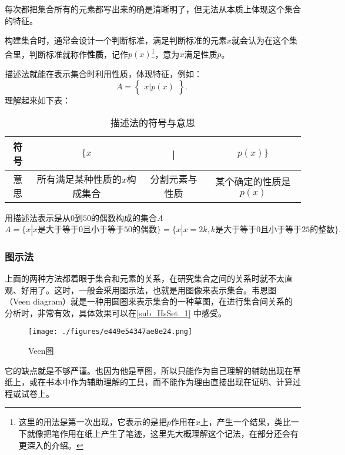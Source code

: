 每次都把集合所有的元素都写出来的确是清晰明了，但无法从本质上体现这个集合的特征。

构建集合时，通常会设计一个判断标准，满足判断标准的元素$x$就会认为在这个集合里，判断标准就称作\textbf{性质}，记作$p(x)$\footnote{这里的用法是第一次出现，它表示的是把$p$作用在$x$上，产生一个结果，类比一下就像把笔作用在纸上产生了笔迹，这里先大概理解这个记法，在部分还会有更深入的介绍。}，意为$x$满足性质$p$。

描述法就能在表示集合时利用性质，体现特征，例如：
\begin{equation}
A=\begin{Bmatrix} x|p(x) \end{Bmatrix}.~
\end{equation}
理解起来如下表：
\begin{table}[h]
\caption{描述法的符号与意思}\label{tab_HsSet1}
\centering
\begin{tabular}{|c|c|c|c|}
\hline
符号 & $\{x$ &|& $p(x)\}$ \\
\hline
意思 & 所有满足某种性质的$x$构成集合 &分割元素与性质& 某个确定的性质是$p(x)$ \\
\hline
\end{tabular}
\end{table}

\begin{example}{用描述法表示是从$0$到$50$的偶数构成的集合$A$}
$$A=\{x|x\text{是大于等于}0\text{且小于等于}50\text{的偶数}\}=\{x|x=2k,k\text{是大于等于}0\text{且小于等于}25\text{的整数}\}.~$$
\end{example}

\subsubsection{图示法}
上面的两种方法都着眼于集合和元素的关系，在研究集合之间的关系时就不太直观、好用了。这时，一般会采用图示法，也就是用图像来表示集合。韦恩图（Veen diagram）就是一种用圆圈来表示集合的一种草图，在进行集合间关系的分析时，非常有效，具体效果可以在\autoref{sub_HsSet_1} 中感受。
\begin{figure}[ht]
\centering
\texttt{[image: ./figures/e449e54347ae8e24.png]}
\caption{Veen图} \label{fig_SufCnd_1}
\end{figure}

它的缺点就是不够严谨。也因为他是草图，所以只能作为自己理解的辅助出现在草纸上，或在书本中作为辅助理解的工具，而不能作为理由直接出现在证明、计算过程或试卷上。


